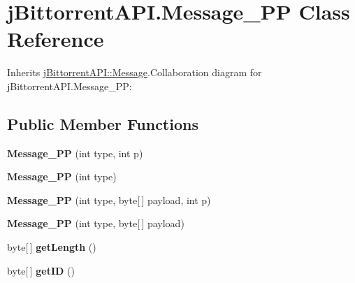 \hypertarget{classj_bittorrent_a_p_i_1_1_message___p_p}{
\section{jBittorrentAPI.Message\_\-PP Class Reference}
\label{classj_bittorrent_a_p_i_1_1_message___p_p}
}


Inherits \hyperlink{classj_bittorrent_a_p_i_1_1_message}{jBittorrentAPI::Message}.Collaboration diagram for jBittorrentAPI.Message\_\-PP:\subsection*{Public Member Functions}
\begin{DoxyCompactItemize}
\item 
\hypertarget{classj_bittorrent_a_p_i_1_1_message___p_p_a79764b73a4957805b59bc74ed131974b}{
{\bfseries Message\_\-PP} (int type, int p)}
\label{classj_bittorrent_a_p_i_1_1_message___p_p_a79764b73a4957805b59bc74ed131974b}

\item 
\hypertarget{classj_bittorrent_a_p_i_1_1_message___p_p_ad9eaf80502e64c247095090456b9e082}{
{\bfseries Message\_\-PP} (int type)}
\label{classj_bittorrent_a_p_i_1_1_message___p_p_ad9eaf80502e64c247095090456b9e082}

\item 
\hypertarget{classj_bittorrent_a_p_i_1_1_message___p_p_a83d5f0bc7ba321b4e9dcefc0bbbf6eca}{
{\bfseries Message\_\-PP} (int type, byte\mbox{[}$\,$\mbox{]} payload, int p)}
\label{classj_bittorrent_a_p_i_1_1_message___p_p_a83d5f0bc7ba321b4e9dcefc0bbbf6eca}

\item 
\hypertarget{classj_bittorrent_a_p_i_1_1_message___p_p_a2647bbf7484a931fc26ea43958e73354}{
{\bfseries Message\_\-PP} (int type, byte\mbox{[}$\,$\mbox{]} payload)}
\label{classj_bittorrent_a_p_i_1_1_message___p_p_a2647bbf7484a931fc26ea43958e73354}

\item 
\hypertarget{classj_bittorrent_a_p_i_1_1_message___p_p_a1e7249579c0f08185d4b5872b9189dce}{
byte\mbox{[}$\,$\mbox{]} {\bfseries getLength} ()}
\label{classj_bittorrent_a_p_i_1_1_message___p_p_a1e7249579c0f08185d4b5872b9189dce}

\item 
\hypertarget{classj_bittorrent_a_p_i_1_1_message___p_p_aa1ae7a1aa030a9922257080a49ba6e1c}{
byte\mbox{[}$\,$\mbox{]} {\bfseries getID} ()}
\label{classj_bittorrent_a_p_i_1_1_message___p_p_aa1ae7a1aa030a9922257080a49ba6e1c}


\end{DoxyCompactItemize}
